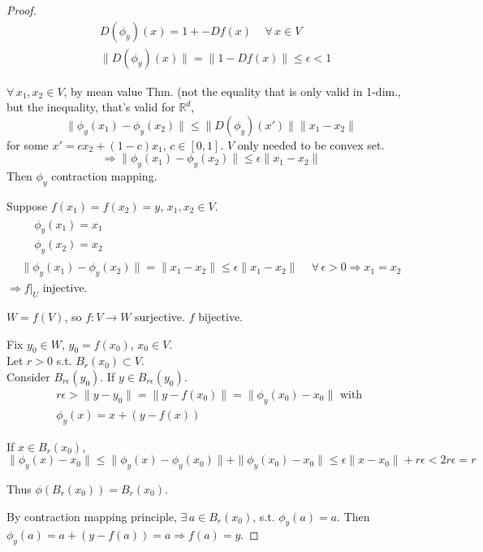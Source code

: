 \documentclass[10pt]{amsart}
\begin{document}
\begin{multicols*}{2}
\begin{proof}
\[
\begin{aligned}
  & D(\phi_y)(x) = 1 + - Df(x) \quad \, \forall \, x \in V \\ 
  & \| D(\phi_y)(x) \| = \| 1 - Df(x) \| \leq \epsilon <1
\end{aligned}
\]

$\forall \, x_1 ,x_2 \in V$, by mean value Thm. (not the equality that is only valid in 1-dim., but the inequality, that's valid for $\mathbb{R}^d$, 
\[
\| \phi_y(x_1) - \phi_y(x_2) \| \leq \| D(\phi_y)(x') \| \| x_1 - x_2 \| 
\]
for some $x' = cx_2 + (1-c)x_1$, $c\in [0,1]$.  $V$ only needed to be convex set.  
\[
\Longrightarrow \| \phi_y(x_1) - \phi_y(x_2) \| \leq \epsilon \| x_1 - x_2 \|
\]
Then $\phi_y$ contraction mapping.  

Suppose $f(x_1) = f(x_2)=y$, $x_1,x_2 \in V$.  
\[
\begin{gathered}
\begin{aligned}
  & \phi_y(x_1) =x_1 \\ 
  & \phi_y(x_2) =x_2  
\end{aligned} \\
\| \phi_y(x_1) - \phi_y(x_2) \| = \| x_1 - x_2 \| \leq \epsilon \| x_1 - x_2 \| \quad \, \forall \, \epsilon > 0 \Longrightarrow x_1 = x_2 
\end{gathered}
\]
$\Longrightarrow \left. f\right|_U$ injective.

$W=f(V)$, so $f:V\to W$ surjective.  $f$ bijective.  

Fix $y_0 \in W$, $y_0 = f(x_0)$, $x_0 \in V$.  \\
Let $r>0$ s.t. $B_r(x_0) \subset V$.  \\
Consider $B_{r\epsilon}(y_0)$.  If $y\in B_{r\epsilon}(y_0)$.  
\[
\begin{gathered}
  r\epsilon > \| y-y_0 \| = \| y - f(x_0) \| = \| \phi_y(x_0) - x_0 \| \text{ with } \\
  \phi_y(x) = x + (y-f(x))
\end{gathered}
\]

If $x\in B_r(x_0)$, 
\[
\| \phi_y(x) -x_0 \| \leq \| \phi_y(x) - \phi_y(x_0) \|  + \| \phi_y(x_0) - x_0 \| \leq \epsilon \| x-x_0 \| + r\epsilon < 2 r\epsilon = r
\]


Thus $\phi(B_r(x_0)) = B_r(x_0)$.

By contraction mapping principle, $\exists \, a \in B_r(x_0)$, s.t. $\phi_y(a)=a$.  Then $\phi_y(a) = a+ (y-f(a)) = a \Longrightarrow f(a) =y$.  


\end{proof}
\end{multicols*}
\end{document}
